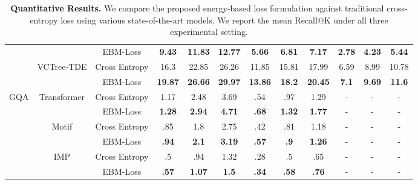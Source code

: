 \documentclass[final]{cvpr}
\begin{document}
\begin{table*}[t]
{\begin{tabular}{@{}lccccccccccc@{}}
                                         &                                & EBM-Loss      & \textbf{9.43}  & \textbf{11.83} & \textbf{12.77} & \textbf{5.66}  & \textbf{6.81}  & \textbf{7.17}  & \textbf{2.78} & \textbf{4.23} & \textbf{5.44} \\ \cmidrule(l){2-12} 
                                         & \multirow{2}{*}{VCTree-TDE \cite{tang2020unbiased}} & Cross Entropy & 16.3           & 22.85          & 26.26          & 11.85          & 15.81          & 17.99          & 6.59          & 8.99          & 10.78         \\
                                         &                                & EBM-Loss      & \textbf{19.87} & \textbf{26.66} & \textbf{29.97} & \textbf{13.86} & \textbf{18.2}  & \textbf{20.45} & \textbf{7.1}  & \textbf{9.69} & \textbf{11.6} \\ \midrule
\multicolumn{1}{c}{\multirow{6}{*}{GQA}} & \multirow{2}{*}{Transformer \cite{vaswani2017attention}}   & Cross Entropy & 1.17           & 2.48           & 3.69           & .54            & .97            & 1.29           & -             & -             & -             \\
\multicolumn{1}{c}{}                     &                                & EBM-Loss      & \textbf{1.28}  & \textbf{2.94}  & \textbf{4.71}  & \textbf{.68}   & \textbf{1.32}  & \textbf{1.77}  & -             & -             & -             \\ \cmidrule(l){2-12} 
\multicolumn{1}{c}{}                     & \multirow{2}{*}{Motif \cite{zellers2018neural}}         & Cross Entropy & .85            & 1.8            & 2.75           & .42            & .81            & 1.18           & -             & -             & -             \\
\multicolumn{1}{c}{}                     &                                & EBM-Loss      & \textbf{.94}   & \textbf{2.1}   & \textbf{3.19}  & \textbf{.57}   & \textbf{.9}    & \textbf{1.26}  & -             & -             & -             \\ \cmidrule(l){2-12} 
\multicolumn{1}{c}{}                     & \multirow{2}{*}{IMP \cite{xu2017scene}}           & Cross Entropy & .5             & .94            & 1.32           & .28            & .5             & .65            & -             & -             & -             \\
\multicolumn{1}{c}{}                     &                                & EBM-Loss      & \textbf{.57}   & \textbf{1.07}  & \textbf{1.5}   & \textbf{.34}   & \textbf{.58}   & \textbf{.76}   & -             & -             & -             \\ \bottomrule \bottomrule
\end{tabular}
}
\caption{{\bf Quantitative Results.} We compare the proposed energy-based loss formulation against traditional cross-entropy loss using various state-of-the-art models. We report the mean Recall@K \cite{tang2019learning} under all three experimental setting.}
\label{tabel:quantative_results}
\vspace{-0.1in}
\end{table*}
\end{document}
